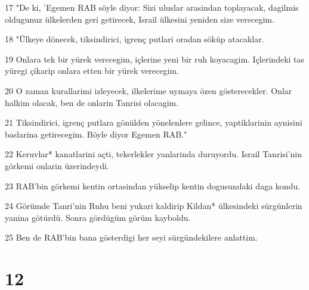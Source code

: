 \par 17 "De ki, 'Egemen RAB söyle diyor: Sizi uluslar arasindan toplayacak, dagilmis oldugunuz ülkelerden geri getirecek, Israil ülkesini yeniden size verecegim.
\par 18 "Ülkeye dönecek, tiksindirici, igrenç putlari oradan söküp atacaklar.
\par 19 Onlara tek bir yürek verecegim, içlerine yeni bir ruh koyacagim. Içlerindeki tas yüregi çikarip onlara etten bir yürek verecegim.
\par 20 O zaman kurallarimi izleyecek, ilkelerime uymaya özen gösterecekler. Onlar halkim olacak, ben de onlarin Tanrisi olacagim.
\par 21 Tiksindirici, igrenç putlara gönülden yönelenlere gelince, yaptiklarinin aynisini baslarina getirecegim. Böyle diyor Egemen RAB."
\par 22 Keruvlar* kanatlarini açti, tekerlekler yanlarinda duruyordu. Israil Tanrisi'nin görkemi onlarin üzerindeydi.
\par 23 RAB'bin görkemi kentin ortasindan yükselip kentin dogusundaki daga kondu.
\par 24 Görümde Tanri'nin Ruhu beni yukari kaldirip Kildan* ülkesindeki sürgünlerin yanina götürdü. Sonra gördügüm görüm kayboldu.
\par 25 Ben de RAB'bin bana gösterdigi her seyi sürgündekilere anlattim.

\chapter{12}

